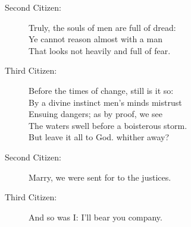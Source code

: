 \documentclass{article}
\begin{document}
\begin{description}
\item[Second Citizen:] 
\hspace{1pt}Truly, the souls of men are full of dread:\\
\hspace{1pt}Ye cannot reason almost with a man\\
\hspace{1pt}That looks not heavily and full of fear.\\
\end{description}
\begin{description}
\item[Third Citizen:] 
\hspace{1pt}Before the times of change, still is it so:\\
\hspace{1pt}By a divine instinct men's minds mistrust\\
\hspace{1pt}Ensuing dangers; as by proof, we see\\
\hspace{1pt}The waters swell before a boisterous storm.\\
\hspace{1pt}But leave it all to God. whither away?\\
\end{description}
\begin{description}
\item[Second Citizen:] 
\hspace{1pt}Marry, we were sent for to the justices.\\
\end{description}
\begin{description}
\item[Third Citizen:] 
\hspace{1pt}And so was I: I'll bear you company.\\
\end{description}
\centering{\it [Exeunt]}\\
\end{document}
